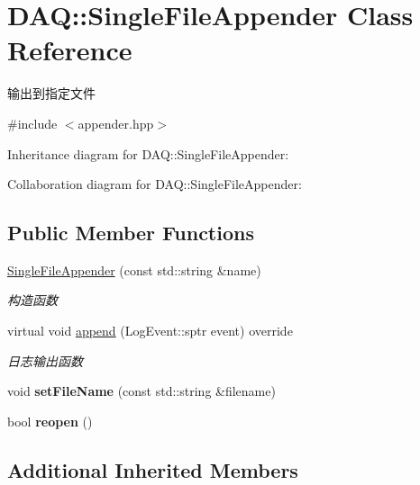 \hypertarget{classDAQ_1_1SingleFileAppender}{}\section{D\+AQ\+:\+:Single\+File\+Appender Class Reference}
\label{classDAQ_1_1SingleFileAppender}


输出到指定文件  




{\ttfamily \#include $<$appender.\+hpp$>$}



Inheritance diagram for D\+AQ\+:\+:Single\+File\+Appender\+:


Collaboration diagram for D\+AQ\+:\+:Single\+File\+Appender\+:
\subsection*{Public Member Functions}
\begin{DoxyCompactItemize}
\item 
\hyperlink{classDAQ_1_1SingleFileAppender_ab33bab53a0f1fc7a4c8ab8d3aba1282e}{Single\+File\+Appender} (const std\+::string \&name)
\begin{DoxyCompactList}\small\item\em 构造函数 \end{DoxyCompactList}\item 
virtual void \hyperlink{classDAQ_1_1SingleFileAppender_ae006b18883d7b57302ef8335e095a0e3}{append} (Log\+Event\+::sptr event) override
\begin{DoxyCompactList}\small\item\em 日志输出函数 \end{DoxyCompactList}\item 
\mbox{\label{classDAQ_1_1SingleFileAppender_a81969780daee52f84efd63817c9edefc}} 
void {\bfseries set\+File\+Name} (const std\+::string \&filename)
\item 
\mbox{\label{classDAQ_1_1SingleFileAppender_ad08f9148e0df97fc5565b1358332a634}} 
bool {\bfseries reopen} ()
\end{DoxyCompactItemize}
\subsection*{Additional Inherited Members}


